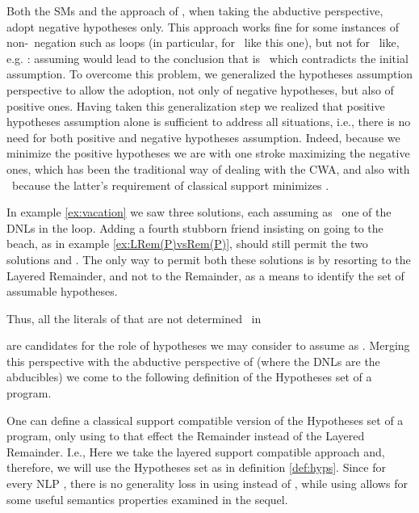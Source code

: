 \documentclass{llncs}
\begin{document}
			Both the SMs and the approach of \cite{DBLP:journals/logcom/KakasKT92}, when taking the abductive perspective, adopt negative
			hypotheses only.
This approach works fine for some instances of non-\wf\ negation such as loops (in particular, for \elons\ like this one), but not for
			\olons\ like, e.g. :
			assuming  would lead to the conclusion that  is \true\ which contradicts the initial assumption.
			To overcome this problem, we generalized the hypotheses assumption perspective to allow the adoption, not only of negative hypotheses,
			but also of positive ones.
			Having taken this generalization step we realized that positive hypotheses assumption alone is sufficient to address all situations, i.e.,
			there is no need for both positive and negative hypotheses assumption.
			Indeed, because we minimize the positive hypotheses we are with one stroke maximizing the negative ones, which has been the traditional
			way of dealing with the CWA, and also with \sms\ because the latter's requirement of classical support minimizes \ms.


			In example \ref{ex:vacation} we saw three solutions, each assuming as \true\ one of the DNLs in the loop.
			Adding a fourth stubborn friend insisting on going to the beach, as in example \ref{ex:LRem(P)vsRem(P)}, should still permit the two
			solutions  and .
			The only way to permit both these solutions is by resorting to the Layered Remainder, and not to the Remainder, as a means to identify
			the set of assumable hypotheses.
			
Thus, all the literals of  that are not determined \false\ in

are candidates for the role of hypotheses we may consider to assume as \true.
Merging this perspective with the abductive perspective of \cite{DBLP:journals/logcom/KakasKT92} (where the DNLs are the abducibles) we 
			come to the following definition of the Hypotheses set of a program.
			
			One can define a classical support compatible version of the Hypotheses set of a program, only using to that effect the Remainder 
			instead of the Layered Remainder. I.e.,	
			Here we take the layered support compatible approach and, therefore, we will use the Hypotheses set as in definition
			\ref{def:hyps}.
			Since  for every NLP , there is no generality loss in using  instead of , while
			using  allows for some useful semantics properties examined in the sequel.		
\end{document}
